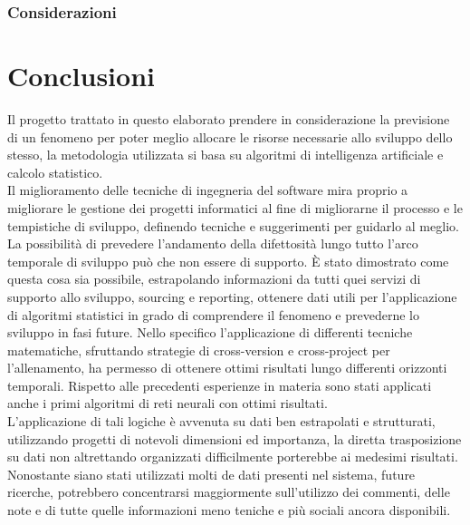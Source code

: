 \documentclass[%
    corpo=12pt,
    twoside,
    oldstyle,
    autoretitolo,
    greek,
    evenboxes,
]{toptesi}
\begin{document}
\subsection{Considerazioni}



\chapter{Conclusioni}
Il progetto trattato in questo elaborato prendere in considerazione la previsione di un fenomeno per poter meglio allocare le risorse necessarie allo sviluppo dello stesso, la metodologia utilizzata si basa su algoritmi di intelligenza artificiale e calcolo statistico.\\
Il miglioramento delle tecniche di ingegneria del software mira proprio a migliorare le gestione dei progetti informatici al fine di migliorarne il processo e le tempistiche di sviluppo, definendo tecniche e suggerimenti per guidarlo al meglio. La possibilità di prevedere l'andamento della difettosità lungo tutto l'arco temporale di sviluppo può che non essere di supporto. È stato dimostrato come questa cosa sia possibile, estrapolando informazioni da tutti quei servizi di supporto allo sviluppo, sourcing e reporting, ottenere dati utili per l'applicazione di algoritmi statistici in grado di comprendere il fenomeno e prevederne lo sviluppo in fasi future. Nello specifico l'applicazione di differenti tecniche matematiche, sfruttando strategie di cross-version e cross-project \cite{Chen} per l'allenamento, ha permesso di ottenere ottimi risultati lungo differenti orizzonti temporali. Rispetto alle precedenti esperienze \cite{santosh_se}\cite{rathore} in materia sono stati applicati anche i primi algoritmi di reti neurali con ottimi risultati.\\
L'applicazione di tali logiche è avvenuta su dati ben estrapolati e strutturati, utilizzando progetti di notevoli dimensioni ed importanza, la diretta trasposizione su dati non altrettando organizzati difficilmente porterebbe ai medesimi risultati. Nonostante siano stati utilizzati molti de dati presenti nel sistema, future ricerche, potrebbero concentrarsi maggiormente sull'utilizzo dei commenti, delle note e di tutte quelle informazioni meno teniche e più sociali ancora disponibili.




\end{document}
